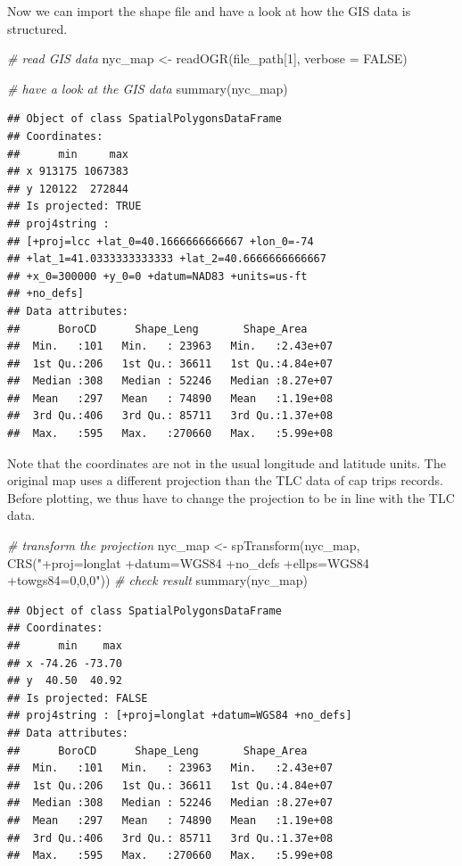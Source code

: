 \documentclass[
  12pt,
]{style/krantz}
\newenvironment{Shaded}{\begin{snugshade}}{\end{snugshade}}
\newcommand{\AttributeTok}[1]{\textcolor[rgb]{0.77,0.63,0.00}{#1}}
\newcommand{\CommentTok}[1]{\textcolor[rgb]{0.56,0.35,0.01}{\textit{#1}}}
\newcommand{\ConstantTok}[1]{\textcolor[rgb]{0.00,0.00,0.00}{#1}}
\newcommand{\DecValTok}[1]{\textcolor[rgb]{0.00,0.00,0.81}{#1}}
\newcommand{\FunctionTok}[1]{\textcolor[rgb]{0.00,0.00,0.00}{#1}}
\newcommand{\NormalTok}[1]{#1}
\newcommand{\OtherTok}[1]{\textcolor[rgb]{0.56,0.35,0.01}{#1}}
\newcommand{\StringTok}[1]{\textcolor[rgb]{0.31,0.60,0.02}{#1}}
\begin{document}
Now we can import the shape file and have a look at how the GIS data is structured.

\begin{Shaded}
\begin{Highlighting}[]
\CommentTok{\# read GIS data}
\NormalTok{nyc\_map }\OtherTok{\textless{}{-}} \FunctionTok{readOGR}\NormalTok{(file\_path[}\DecValTok{1}\NormalTok{], }\AttributeTok{verbose =} \ConstantTok{FALSE}\NormalTok{)}

\CommentTok{\# have a look at the GIS data}
\FunctionTok{summary}\NormalTok{(nyc\_map)}
\end{Highlighting}
\end{Shaded}

\begin{verbatim}
## Object of class SpatialPolygonsDataFrame
## Coordinates:
##      min     max
## x 913175 1067383
## y 120122  272844
## Is projected: TRUE 
## proj4string :
## [+proj=lcc +lat_0=40.1666666666667 +lon_0=-74
## +lat_1=41.0333333333333 +lat_2=40.6666666666667
## +x_0=300000 +y_0=0 +datum=NAD83 +units=us-ft
## +no_defs]
## Data attributes:
##      BoroCD      Shape_Leng       Shape_Area      
##  Min.   :101   Min.   : 23963   Min.   :2.43e+07  
##  1st Qu.:206   1st Qu.: 36611   1st Qu.:4.84e+07  
##  Median :308   Median : 52246   Median :8.27e+07  
##  Mean   :297   Mean   : 74890   Mean   :1.19e+08  
##  3rd Qu.:406   3rd Qu.: 85711   3rd Qu.:1.37e+08  
##  Max.   :595   Max.   :270660   Max.   :5.99e+08
\end{verbatim}

Note that the coordinates are not in the usual longitude and latitude units. The original map uses a different projection than the TLC data of cap trips records. Before plotting, we thus have to change the projection to be in line with the TLC data.

\begin{Shaded}
\begin{Highlighting}[]
\CommentTok{\# transform the projection}
\NormalTok{nyc\_map }\OtherTok{\textless{}{-}} \FunctionTok{spTransform}\NormalTok{(nyc\_map, }\FunctionTok{CRS}\NormalTok{(}\StringTok{"+proj=longlat +datum=WGS84 +no\_defs +ellps=WGS84 +towgs84=0,0,0"}\NormalTok{))}
\CommentTok{\# check result}
\FunctionTok{summary}\NormalTok{(nyc\_map)}
\end{Highlighting}
\end{Shaded}

\begin{verbatim}
## Object of class SpatialPolygonsDataFrame
## Coordinates:
##      min    max
## x -74.26 -73.70
## y  40.50  40.92
## Is projected: FALSE 
## proj4string : [+proj=longlat +datum=WGS84 +no_defs]
## Data attributes:
##      BoroCD      Shape_Leng       Shape_Area      
##  Min.   :101   Min.   : 23963   Min.   :2.43e+07  
##  1st Qu.:206   1st Qu.: 36611   1st Qu.:4.84e+07  
##  Median :308   Median : 52246   Median :8.27e+07  
##  Mean   :297   Mean   : 74890   Mean   :1.19e+08  
##  3rd Qu.:406   3rd Qu.: 85711   3rd Qu.:1.37e+08  
##  Max.   :595   Max.   :270660   Max.   :5.99e+08
\end{verbatim}
\end{document}
